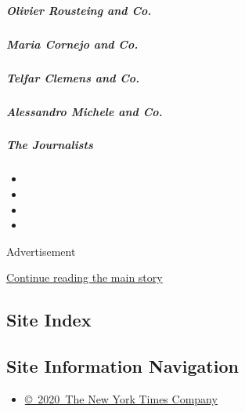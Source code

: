 \hypertarget{olivier-rousteing-and-co}{%
\subparagraph{Olivier Rousteing and
Co.}\label{olivier-rousteing-and-co}}

\href{/interactive/2020/04/13/t-magazine/maria-cornejo-olivier-rousteing-telfar-clemens-alessandro-michele.html\#maria-cornejo-and-co}{}

\hypertarget{maria-cornejo-and-co}{%
\subparagraph{Maria Cornejo and Co.}\label{maria-cornejo-and-co}}

\href{/interactive/2020/04/13/t-magazine/maria-cornejo-olivier-rousteing-telfar-clemens-alessandro-michele.html\#telfar-clemens-and-co}{}

\hypertarget{telfar-clemens-and-co}{%
\subparagraph{Telfar Clemens and Co.}\label{telfar-clemens-and-co}}

\href{/interactive/2020/04/13/t-magazine/maria-cornejo-olivier-rousteing-telfar-clemens-alessandro-michele.html\#alessandro-michele-and-co}{}

\hypertarget{alessandro-michele-and-co}{%
\subparagraph{Alessandro Michele and
Co.}\label{alessandro-michele-and-co}}

\href{/interactive/2020/04/13/t-magazine/foreign-correspondents.html}{}

\hypertarget{the-journalists}{%
\subparagraph{The Journalists}\label{the-journalists}}

\begin{itemize}
\item
\item
\item
\item
\end{itemize}

Advertisement

\protect\hyperlink{after-bottom}{Continue reading the main story}

\hypertarget{site-index}{%
\subsection{Site Index}\label{site-index}}

\hypertarget{site-information-navigation}{%
\subsection{Site Information
Navigation}\label{site-information-navigation}}

\begin{itemize}
\tightlist
\item
  \href{https://help.nytimes.com/hc/en-us/articles/115014792127-Copyright-notice}{©~2020~The
  New York Times Company}
\end{itemize}

